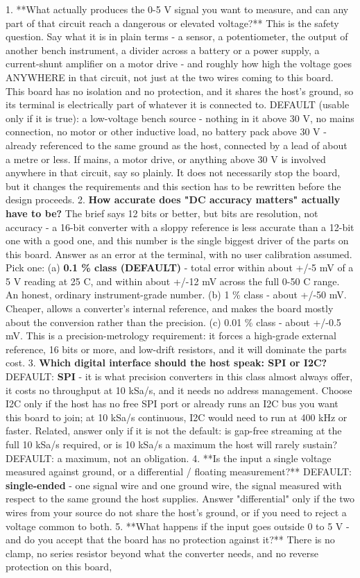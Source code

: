 \documentclass[11pt,a4paper]{article}
\begin{document}
1. {*}{*}What actually produces the 0-5 V signal you want to measure, and can any part of that circuit reach a dangerous or elevated voltage?{*}{*} This is the safety question. Say what it is in plain terms - a sensor, a potentiometer, the output of another bench instrument, a divider across a battery or a power supply, a current-shunt amplifier on a motor drive - and roughly how high the voltage goes ANYWHERE in that circuit, not just at the two wires coming to this board. This board has no isolation and no protection, and it shares the host's ground, so its terminal is electrically part of whatever it is connected to. DEFAULT (usable only if it is true): a low-voltage bench source - nothing in it above 30 V, no mains connection, no motor or other inductive load, no battery pack above 30 V - already referenced to the same ground as the host, connected by a lead of about a metre or less. If mains, a motor drive, or anything above 30 V is involved anywhere in that circuit, say so plainly. It does not necessarily stop the board, but it changes the requirements and this section has to be rewritten before the design proceeds. 2. \textbf{How accurate does "DC accuracy matters" actually have to be?} The brief says 12 bits or better, but bits are resolution, not accuracy - a 16-bit converter with a sloppy reference is less accurate than a 12-bit one with a good one, and this number is the single biggest driver of the parts on this board. Answer as an error at the terminal, with no user calibration assumed. Pick one: (a) \textbf{0.1 \% class (DEFAULT)} - total error within about +/-5 mV of a 5 V reading at 25 C, and within about +/-12 mV across the full 0-50 C range. An honest, ordinary instrument-grade number. (b) 1 \% class - about +/-50 mV. Cheaper, allows a converter's internal reference, and makes the board mostly about the conversion rather than the precision. (c) 0.01 \% class - about +/-0.5 mV. This is a precision-metrology requirement: it forces a high-grade external reference, 16 bits or more, and low-drift resistors, and it will dominate the parts cost. 3. \textbf{Which digital interface should the host speak: SPI or I2C?} DEFAULT: \textbf{SPI} - it is what precision converters in this class almost always offer, it costs no throughput at 10 kSa/s, and it needs no address management. Choose I2C only if the host has no free SPI port or already runs an I2C bus you want this board to join; at 10 kSa/s continuous, I2C would need to run at 400 kHz or faster. Related, answer only if it is not the default: is gap-free streaming at the full 10 kSa/s required, or is 10 kSa/s a maximum the host will rarely sustain? DEFAULT: a maximum, not an obligation. 4. {*}{*}Is the input a single voltage measured against ground, or a differential / floating measurement?{*}{*} DEFAULT: \textbf{single-ended} - one signal wire and one ground wire, the signal measured with respect to the same ground the host supplies. Answer "differential" only if the two wires from your source do not share the host's ground, or if you need to reject a voltage common to both. 5. {*}{*}What happens if the input goes outside 0 to 5 V - and do you accept that the board has no protection against it?{*}{*} There is no clamp, no series resistor beyond what the converter needs, and no reverse protection on this board, 
\end{document}
